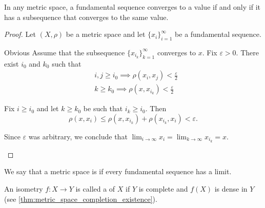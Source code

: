 \begin{proposition}\label{thm:fundamental_subsequence_convergence}
  In any metric space, a fundamental sequence converges to a value if and only if it has a subsequence that converges to the same value.
\end{proposition}
\begin{proof}
  Let \( (X, \rho) \) be a metric space and let \( \{ x_i \}_{i=1}^\infty \) be a fundamental sequence.

  \begin{description}
    \Implies Obvious
    \ImpliedBy Assume that the subsequence \( \{ x_{i_k} \}_{k=1}^\infty \) converges to \( x \). Fix \( \varepsilon > 0 \). There exist \( i_0 \) and \( k_0 \) such that
    \begin{align*}
      &i, j \geq i_0 \implies \rho(x_i, x_j) < \tfrac \varepsilon 2 \\
      &k \geq k_0 \implies \rho(x, x_{i_k}) < \tfrac \varepsilon 2
    \end{align*}

    Fix \( i \geq i_0 \) and let \( k \geq k_0 \) be such that \( i_k \geq i_0 \). Then
    \begin{equation*}
      \rho(x, x_i) \leq \rho(x, x_{i_k}) + \rho(x_{i_k}, x_i) < \varepsilon.
    \end{equation*}

    Since \( \varepsilon \) was arbitrary, we conclude that \( \lim_{i \to \infty} x_i = \lim_{k \to \infty} x_{i_k} = x \).
  \end{description}
\end{proof}

\begin{definition}\label{def:complete_metric_space}
  We say that a metric space is  if every fundamental sequence has a limit.

  An isometry \( f: X \to Y \) is called a  of \( X \) if \( Y \) is complete and \( f(X) \) is dense in \( Y \) (see \cref{thm:metric_space_completion_existence}).
\end{definition}

